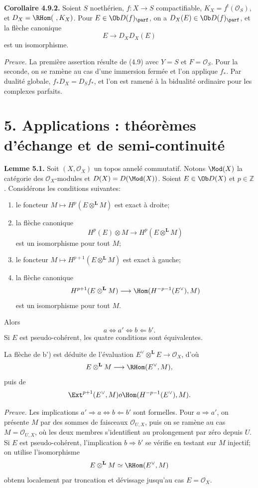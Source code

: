 \documentclass[11pt]{article}
\begin{document}
\textbf{Corollaire 4.9.2.} Soient \(S\) noethérien, \(f:X\to S\) compactifiable, \(K_X=f^!(\mathcal O_S)\), et \(D_X=\RHom(\ ,K_X)\). Pour \(E\in\Ob D(f)_{\parf}\), on a \(D_X(E)\in\Ob D(f)_{\parf}\), et la flèche canonique
\[
 E\longrightarrow D_XD_X(E)
\]
est un isomorphisme.

\emph{Preuve.} La première assertion résulte de (4.9) avec \(Y=S\) et \(F=\mathcal O_S\). Pour la seconde, on se ramène au cas d'une immersion fermée et l'on applique \(f_*\). Par dualité globale, \(f_*D_X=D_Sf_*\), et l'on est ramené à la bidualité ordinaire pour les complexes parfaits.

\section*{5. Applications : théorèmes d'échange et de semi-continuité}

\textbf{Lemme 5.1.} Soit \((X,\mathcal O_X)\) un topos annelé commutatif. Notons \(\Mod(X)\) la catégorie des \(\mathcal O_X\)-modules et \(D(X)=D(\Mod(X))\). Soient \(E\in\Ob D(X)\) et \(p\in\mathbb Z\). Considérons les conditions suivantes:
\begin{enumerate}[label=\alph*)]
\item le foncteur \(M\mapsto H^p(E\otimes^{\mathbf L}M)\) est exact à droite;
\item[\(\mathrm a'\)] la flèche canonique
\[
 H^p(E)\otimes M\longrightarrow H^p(E\otimes^{\mathbf L}M)
\]
est un isomorphisme pour tout \(M\);
\item[\(\mathrm b\)] le foncteur \(M\mapsto H^{p+1}(E\otimes^{\mathbf L}M)\) est exact à gauche;
\item[\(\mathrm b'\)] la flèche canonique
\[
 H^{p+1}(E\otimes^{\mathbf L}M)
 \longrightarrow
 \Hom(H^{-p-1}(E^{\vee}),M)
\]
est un isomorphisme pour tout \(M\).
\end{enumerate}
Alors
\[
 a\Longleftrightarrow a'\Longleftrightarrow b\Longleftarrow b'.
\]
Si \(E\) est pseudo-cohérent, les quatre conditions sont équivalentes.

La flèche de b') est déduite de l'évaluation \(E^{\vee}\otimes^{\mathbf L}E\to\mathcal O_X\), d'où
\[
 E\otimes^{\mathbf L}M\longrightarrow \RHom(E^{\vee},M),
\]
puis de
\[
 \Ext^{p+1}(E^{\vee},M)	o\Hom(H^{-p-1}(E^{\vee}),M).
\]

\emph{Preuve.} Les implications \(a'\Rightarrow a\Leftrightarrow b\Leftarrow b'\) sont formelles. Pour \(a\Rightarrow a'\), on présente \(M\) par des sommes de faisceaux \(\mathcal O_{U,X}\), puis on se ramène au cas \(M=\mathcal O_{U,X}\), où les deux membres s'identifient au prolongement par zéro depuis \(U\). Si \(E\) est pseudo-cohérent, l'implication \(b\Rightarrow b'\) se vérifie en testant sur \(M\) injectif; on utilise l'isomorphisme
\[
 E\otimes^{\mathbf L}M\simeq\RHom(E^{\vee},M)
\]
obtenu localement par troncation et dévissage jusqu'au cas \(E=\mathcal O_X\).
\end{document}
